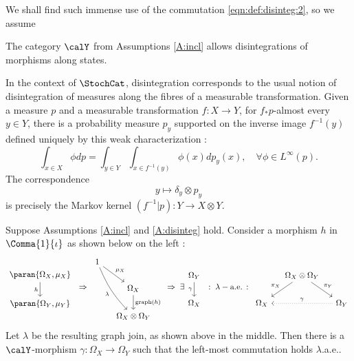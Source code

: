 \documentclass[12pt,oneside,pb-diagram]{article}
\DeclareMathOperator{\graph}{graph}
\begin{document}
We shall find such immense use of the commutation \eqref{eqn:def:disinteg:2}, so we assume

\begin{Assumption} \label{A:disinteg}
	The category $\calY$ from Assumptions \ref{A:incl} allows disintegrations of morphisms along states.
\end{Assumption}

\begin{Erg}{}{} 
	In the context of $\StochCat$, disintegration corresponds to the usual notion of disintegration of measures along the fibres of a measurable transformation. Given a measure $p$ and a measurable transformation $f:X\to Y$, for $f_*p$-almost every $y\in Y$, there is a probability measure $p_y$ supported on the inverse image $f^{-1}(y)$ defined uniquely by this weak characterization :
	\[ \int_{x\in X} \phi dp = \int_{y\in Y} \int_{x \in f^{-1}(y)} \phi(x) dp_y(x) , \quad \forall \phi \in L^\infty(p) . \]
	The correspondence 
	\[ y \mapsto \delta_{y} \otimes p_y \]
	is precisely the Markov kernel $(f^{-1}|p) : Y \to X\otimes Y$.
\end{Erg}

\begin{lemma} \label{lem:subsig:1}
	Suppose Assumptions \ref{A:incl} and \ref{A:disinteg} hold. Consider a morphism $h$ in $\Comma{1}{\iota}$ as shown below on the left : 
	\begin{equation} \label{eqn:lem:subsig:1}
		\begin{tikzcd}\paran{ \Omega_X, \mu_X } \arrow[d, "h"'] \\ \paran{ \Omega_Y, \mu_Y }     \end{tikzcd}
		\;\Rightarrow\;
		\begin{tikzcd} [column sep = small]
			1 \arrow[dr, "\mu_X"] \arrow[ddr, bend right=10, "\lambda"'] \\ 
			& \Omega_X \arrow[d, "\graph(h)"] \\ 
			& \Omega_X \otimes \Omega_Y
		\end{tikzcd}
		\;\Rightarrow\;
		\exists \begin{tikzcd} \Omega_Y \arrow[d, "\gamma"'] \\\Omega_X \end{tikzcd}
		\;:\;
		\lambda-\mbox{a.e.} \,:\,
		\begin{tikzcd} [column sep = small]
			& \Omega_X \otimes \Omega_Y \arrow[dl, "\pi_X"'] \arrow[dr, "\pi_Y"] \\
			\Omega_X && \Omega_Y \arrow[ll, dotted, "\gamma"']
		\end{tikzcd}
	\end{equation}
	Let $\lambda$ be the resulting  graph join, as shown above in the middle. Then there is a $\calY$-morphism $\gamma : \Omega_X \to \Omega_Y$ such that the left-most commutation holds $\lambda$.a.e.. 
\end{lemma}
\end{document}
